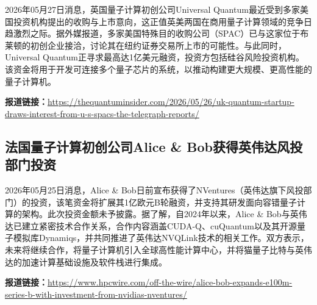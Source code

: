\documentclass[12pt,a4paper]{ctexart}
\begin{document}
2026年05月27日消息，英国量子计算初创公司Universal Quantum最近受到多家美国投资机构提出的收购与上市意向，这正值英美两国在商用量子计算领域的竞争日趋激烈之际。据外媒报道，多家美国特殊目的收购公司（SPAC）已与这家位于布莱顿的初创企业接洽，讨论其在纽约证券交易所上市的可能性。与此同时，Universal Quantum正寻求最高达1亿美元融资，投资方包括硅谷风险投资机构。该资金将用于开发可连接多个量子芯片的系统，以推动构建更大规模、更高性能的量子计算机。

\noindent\textbf{报道链接：}\url{https://thequantuminsider.com/2026/05/26/uk-quantum-startup-draws-interest-from-u-s-spacs-the-telegraph-reports/ }

\subsection{ 法国量子计算初创公司Alice \& Bob获得英伟达风投部门投资 }

2026年05月25日消息，Alice \& Bob日前宣布获得了NVentures（英伟达旗下风投部门）的投资，该笔资金将扩展其1亿欧元B轮融资，并支持其研发面向容错量子计算的架构。此次投资金额未予披露。据了解，自2024年以来，Alice \& Bob与英伟达已建立紧密技术合作关系，合作内容涵盖CUDA-Q、cuQuantum以及其开源量子模拟库Dynamiqs，并共同推进了英伟达NVQLink技术的相关工作。双方表示，未来将继续合作，将量子计算机引入全球高性能计算中心，并将猫量子比特与英伟达的加速计算基础设施及软件栈进行集成。

\noindent\textbf{报道链接：}\url{https://www.hpcwire.com/off-the-wire/alice-bob-expands-e100m-series-b-with-investment-from-nvidias-nventures/ }
\end{document}
